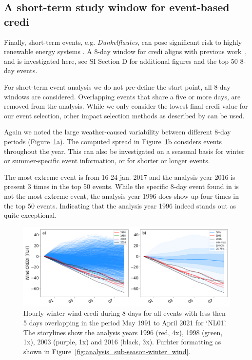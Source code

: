 \documentclass[a4paper,11pt]{extarticle}
\newcommand{\credi}[0]{{\sc credi}}
\newcommand{\wdi}[0]{{\sc wind credi}}
\begin{document}

\subsection{A short-term study window for event-based \credi{}}\label{sc:shortterm}
Finally, short-term events, e.g. \emph{Dunkelflautes}, can pose significant risk to highly renewable energy systems \parencite{tedesco2023,Mockert2022arxiv,vanderwiel2019extreme,Li2022,Sundar2022}. 
A 8-day window for \credi{} aligns with previous work~\parencite{tennet2023}, and is investigated here, see SI Section D for additional figures and the top 50 8-day events. 

For short-term event analysis we do not pre-define the start point, all 8-day windows are considered. 
Overlapping events that share a five or more days, are removed from the analysis. 
While we only consider the lowest final \credi{} value for our event selection, other impact selection methods as described by \textcite{vanderWiel2021} can be used.

Again we noted the large weather-caused variability between different 8-day periods (Figure~\ref{fig:analysis_short-term-winter_wind}a). 
The computed spread in Figure~\ref{fig:analysis_short-term-winter_wind}b considers events throughout the year. 
This can also be investigated on a seasonal basis for winter or summer-specific event information, or for shorter or longer events.  

The most extreme event is from 16-24 jan. 2017 and the analysis year 2016 is present 3 times in the top 50 events. 
While the specific 8-day event found in \textcite{tennet2023} is not the most extreme event, the analysis year 1996 does show up four times in the top 50 events. 
Indicating that the analysis year 1996 indeed stands out as quite exceptional.

\begin{figure}[t]
        \centering
        \includegraphics[width=\textwidth]{WindCREDI_shortterm}
        \caption{
                Hourly winter \wdi{} during 8-days for all events with less then 5 days overlapping in the period May 1991 to April 2021 for `NL01'. 
                The storylines show the analysis years 1996 (red, 4x), 1998 (green, 1x), 2003 (purple, 1x) and 2016 (black, 3x). 
                Furhter formatting as shown in Figure~\ref{fig:analysis_sub-season-winter_wind}.
        }
        \label{fig:analysis_short-term-winter_wind}
\end{figure}
\end{document}
